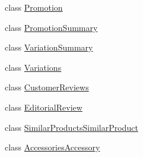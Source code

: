 \begin{DoxyCompactItemize}
class \hyperlink{class_amazon___price___finder_1_1amazon_1_1ecs_1_1_promotion}{Promotion}
\begin{DoxyCompactList}\small\item\em \end{DoxyCompactList}\item 
class \hyperlink{class_amazon___price___finder_1_1amazon_1_1ecs_1_1_promotion_summary}{Promotion\-Summary}
\begin{DoxyCompactList}\small\item\em \end{DoxyCompactList}\item 
class \hyperlink{class_amazon___price___finder_1_1amazon_1_1ecs_1_1_variation_summary}{Variation\-Summary}
\begin{DoxyCompactList}\small\item\em \end{DoxyCompactList}\item 
class \hyperlink{class_amazon___price___finder_1_1amazon_1_1ecs_1_1_variations}{Variations}
\begin{DoxyCompactList}\small\item\em \end{DoxyCompactList}\item 
class \hyperlink{class_amazon___price___finder_1_1amazon_1_1ecs_1_1_customer_reviews}{Customer\-Reviews}
\begin{DoxyCompactList}\small\item\em \end{DoxyCompactList}\item 
class \hyperlink{class_amazon___price___finder_1_1amazon_1_1ecs_1_1_editorial_review}{Editorial\-Review}
\begin{DoxyCompactList}\small\item\em \end{DoxyCompactList}\item 
class \hyperlink{class_amazon___price___finder_1_1amazon_1_1ecs_1_1_similar_products_similar_product}{Similar\-Products\-Similar\-Product}
\begin{DoxyCompactList}\small\item\em \end{DoxyCompactList}\item 
class \hyperlink{class_amazon___price___finder_1_1amazon_1_1ecs_1_1_accessories_accessory}{Accessories\-Accessory}
\begin{DoxyCompactList}\small\item\em \end{DoxyCompactList}\item 

\end{DoxyCompactItemize}
